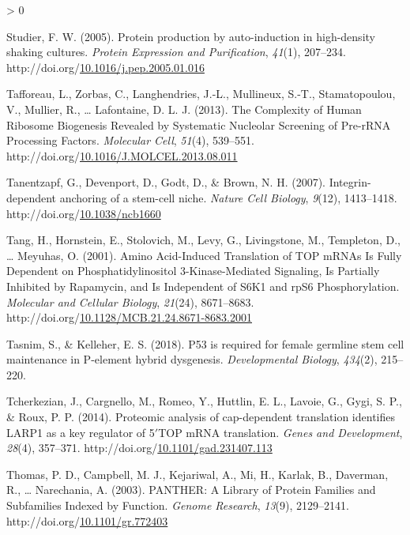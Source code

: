 \documentclass[12pt,oneside]{reedthesis}
\newlength{\cslhangindent}
\newenvironment{CSLReferences}[2] %
 {%
  \setlength{\parindent}{0pt}
  \ifodd #1 \everypar{\setlength{\hangindent}{\cslhangindent}}\ignorespaces\fi
  \ifnum #2 > 0
  \setlength{\parskip}{#2\baselineskip}
  \fi
 }%
 {}
\begin{document}
\begin{CSLReferences}{1}{0}
\leavevmode\hypertarget{ref-studierProteinProductionAutoinduction2005}{}%
Studier, F. W. (2005). Protein production by auto-induction in high-density shaking cultures. \emph{Protein Expression and Purification}, \emph{41}(1), 207--234. http://doi.org/\href{https://doi.org/10.1016/j.pep.2005.01.016}{10.1016/j.pep.2005.01.016}

\leavevmode\hypertarget{ref-Tafforeau2013a}{}%
Tafforeau, L., Zorbas, C., Langhendries, J.-L., Mullineux, S.-T., Stamatopoulou, V., Mullier, R., \ldots{} Lafontaine, D. L. J. (2013). The {Complexity} of {Human Ribosome Biogenesis Revealed} by {Systematic Nucleolar Screening} of {Pre-rRNA Processing Factors}. \emph{Molecular Cell}, \emph{51}(4), 539--551. http://doi.org/\href{https://doi.org/10.1016/J.MOLCEL.2013.08.011}{10.1016/J.MOLCEL.2013.08.011}

\leavevmode\hypertarget{ref-tanentzapfIntegrindependentAnchoringStemcell2007}{}%
Tanentzapf, G., Devenport, D., Godt, D., \& Brown, N. H. (2007). Integrin-dependent anchoring of a stem-cell niche. \emph{Nature Cell Biology}, \emph{9}(12), 1413--1418. http://doi.org/\href{https://doi.org/10.1038/ncb1660}{10.1038/ncb1660}

\leavevmode\hypertarget{ref-tangAminoAcidInducedTranslation2001}{}%
Tang, H., Hornstein, E., Stolovich, M., Levy, G., Livingstone, M., Templeton, D., \ldots{} Meyuhas, O. (2001). Amino {Acid-Induced Translation} of {TOP mRNAs Is Fully Dependent} on {Phosphatidylinositol} 3-{Kinase-Mediated Signaling}, {Is Partially Inhibited} by {Rapamycin}, and {Is Independent} of {S6K1} and {rpS6 Phosphorylation}. \emph{Molecular and Cellular Biology}, \emph{21}(24), 8671--8683. http://doi.org/\href{https://doi.org/10.1128/MCB.21.24.8671-8683.2001}{10.1128/MCB.21.24.8671-8683.2001}

\leavevmode\hypertarget{ref-Tasnim2018a}{}%
Tasnim, S., \& Kelleher, E. S. (2018). P53 is required for female germline stem cell maintenance in {P-element} hybrid dysgenesis. \emph{Developmental Biology}, \emph{434}(2), 215--220.

\leavevmode\hypertarget{ref-Tcherkezian2014b}{}%
Tcherkezian, J., Cargnello, M., Romeo, Y., Huttlin, E. L., Lavoie, G., Gygi, S. P., \& Roux, P. P. (2014). Proteomic analysis of cap-dependent translation identifies {LARP1} as a key regulator of 5{\({'}\)}{TOP mRNA} translation. \emph{Genes and Development}, \emph{28}(4), 357--371. http://doi.org/\href{https://doi.org/10.1101/gad.231407.113}{10.1101/gad.231407.113}

\leavevmode\hypertarget{ref-thomasPANTHERLibraryProtein2003}{}%
Thomas, P. D., Campbell, M. J., Kejariwal, A., Mi, H., Karlak, B., Daverman, R., \ldots{} Narechania, A. (2003). {PANTHER}: {A Library} of {Protein Families} and {Subfamilies Indexed} by {Function}. \emph{Genome Research}, \emph{13}(9), 2129--2141. http://doi.org/\href{https://doi.org/10.1101/gr.772403}{10.1101/gr.772403}


\end{CSLReferences}
\end{document}
